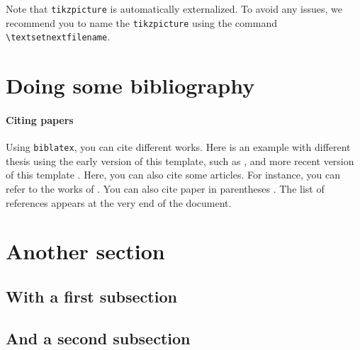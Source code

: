 \begin{remark}
    Note that \texttt{tikzpicture} is automatically externalized.
    To avoid any issues, we recommend you to name the \texttt{tikzpicture} using the command \texttt{\textbackslash textsetnextfilename}.
\end{remark}






\section{Doing some bibliography}%
\label{sec:doing_some_bibliography}

\paragraph{Citing papers}%
\label{par:Citing papers}
Using \texttt{biblatex}, you can cite different works.
Here is an example with different thesis using the early version of this template, such as \textcite{cherriere_elaboration_2023,caruel_caracterisation_2023,ruda_methode_2023,abdel_hafiz_etude_2023}, and more recent version of this template \parencite{daby-seesaram_towards_2023,loiseau_formulation_2023}.
Here, you can also cite some articles.
For instance, you can refer to the works of \textcite{wurtzer_premiere_2022,ribeiro_nogueira_differential_2024}.
You can also cite paper in parentheses \parencite{ruda_first_2022,daby-seesaram_hybrid_2023}.
The list of references appears at the very end of the document.

\section{Another section}%
\label{sec:Another section}

\subsection{With a first subsection}%
\label{sub:with_a_first_subsection}

\lipsum[2-4]

\subsection{And a second subsection}%
\label{sub:and_a_second_subsection}

\lipsum[2-4]

\begin{chaptersummary}
    \lipsum
\end{chaptersummary}
